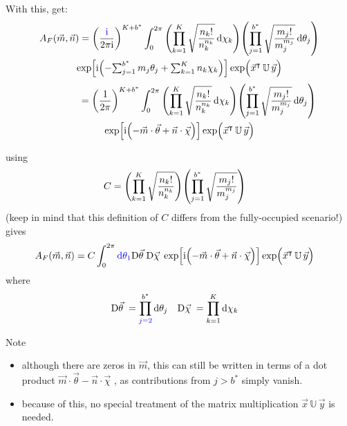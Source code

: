 \documentclass[
	english,
	a4paper,
	fontsize=10pt,
	parskip=half,
	titlepage=true,
	DIV=12,
	final
]{scrreprt}
\newcommand*{\transp}{\ensuremath{^\intercal}}
\newcommand*{\iunit}{\ensuremath{\mathrm{i}}}
\newcommand*{\DD}[1]{\ensuremath{\text{D}\vec{#1}\;}}
\begin{document}
With this, get:
\begin{multline}
	A_F(\vec{m}, \vec{n})
=
	\qty(
		\frac{{\color{blue}\iunit}}{2\pi\iunit}
	)^{K + b^*}
	\int_{0}^{2\pi}
		\qty( \prod_{k=1}^{K}
			\sqrt{\frac
				{ n_k! }
				{ n_k^{n_k} }
			}\dd{\chi_k}
		)
		\qty( \prod_{j=1}^{b^*}
			\sqrt{\frac
				{ m_j! }
				{ m_j^{m_j} }
			}\dd{\theta_j}
		)
\\
			\exp[
				\iunit \qty(
				-{\textstyle \sum_{j=1}^{b^*} m_j \theta_j}
				+{\textstyle \sum_{k=1}^{K}   n_k \chi  _k}
			)]
			\exp( \Big. \vec{x}\transp \, \mathbb{U} \, \vec{y})
\end{multline}
\begin{multline}
	\qquad\qquad
=
	\qty(
		\frac{1}{2\pi}
	)^{K + b^*}
	\int_{0}^{2\pi}
		\qty( \prod_{k=1}^{K}
			\sqrt{\frac
				{ n_k! }
				{ n_k^{n_k} }
			} \dd{\chi_k}
		)
		\qty( \prod_{j=1}^{b^*}
			\sqrt{\frac
				{ m_j! }
				{ m_j^{m_j} }
			} \dd{\theta_j}
		)
\\
		\exp[
			\iunit \qty(
			-\vec{m} \cdot \vec{\theta}
			+\vec{n} \cdot \vec{\chi}
		)]
		\exp( \Big. \vec{x}\transp \, \mathbb{U} \, \vec{y})
\end{multline}

using
\begin{align}
	C
&=
	\qty( \prod_{k=1}^{K}
		\sqrt{\frac
			{ n_k! }
			{ n_k^{n_k} }
		}
	)
	\qty( \prod_{j=1}^{b^*}
		\sqrt{\frac
			{ m_j! }
			{ m_j^{m_j} }
		}
	)
\label{eqn:DefC}
\end{align}
({\color{red}keep in mind that this definition of $C$ differs from the fully-occupied scenario!})
gives
\begin{align}
	A_F(\vec{m}, \vec{n})
&=
	C
	\int_{0}^{2\pi}
		{\color{blue} \dd{\theta_1}}
		\DD{\theta}
		\DD{\chi  }
			\exp[
				\iunit \qty(
				-\vec{m} \cdot \vec{\theta}
				+\vec{n} \cdot \vec{\chi}
			)]
			\exp( \Big. \vec{x}\transp \, \mathbb{U} \, \vec{y})
	\label{eqn:BSA_Int_BZO_Polar}
\end{align}
where
\begin{align}
	\DD{\theta}
&=
	\prod_{{\color{blue} j=2}}^{b^*} \dd{\theta_j}
&
	\DD{\chi}
&=
	\prod_{k=1}^{K}   \dd{\chi  _k}
\end{align}

Note
\begin{itemize}
\item although there are zeros in $\vec{m}$, this can still be written in terms of a dot product
	$\vec{m} \cdot \vec{\theta} - \vec{n} \cdot \vec{\chi}$
	, as contributions from $j > b^*$ simply vanish.
\item because of this, no special treatment of the matrix multiplication $\vec{x} \, \mathbb{U} \, \vec{y}$ is needed.
\end{itemize}
\end{document}
